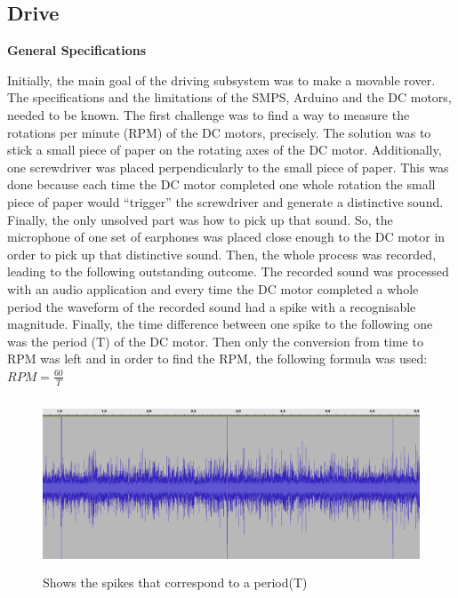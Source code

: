 \documentclass[a4paper]{article}
\begin{document}
\subsection{Drive}

\textbf{General Specifications}

Initially, the main goal of the driving subsystem was to make a movable rover. 
The specifications and the limitations of the SMPS, Arduino and the DC motors, 
needed to be known.  The first challenge was to find a way to measure the 
rotations per minute (RPM) of the DC motors, precisely. The solution was to 
stick a small piece of paper on the rotating axes of the DC motor. Additionally,
one screwdriver was placed perpendicularly to the small piece of paper. This was
done because each time the DC motor completed one whole rotation the small piece
of paper would ``trigger'' the screwdriver and generate a distinctive sound.
Finally, the only unsolved part was how to pick up that sound. So, the 
microphone of one set of earphones was placed close enough to the DC motor in order 
to pick up that distinctive sound. Then, the whole process was recorded, leading 
to the following outstanding outcome. The recorded sound was processed with an 
audio application and every time the DC motor completed a whole period the 
waveform of the recorded sound had a spike with a recognisable magnitude. 
Finally, the time difference between one spike to the following one was the 
period (T) of the DC motor. 
Then only the conversion from time to RPM was left and in order to find the RPM,
the following formula was used: \( RPM=\frac{60}{T} \) 


\begin{figure}[H]
\begin{Center}
\advance\leftskip 0.23in		
    \includegraphics[width=5.06in,height=2.02in]{./media/image2.png}
	\caption{Shows the spikes that correspond to a period(T)}
		\label{Shows the spikes that correspond to a period(T)}
\end{Center}
\end{figure}
\end{document}
